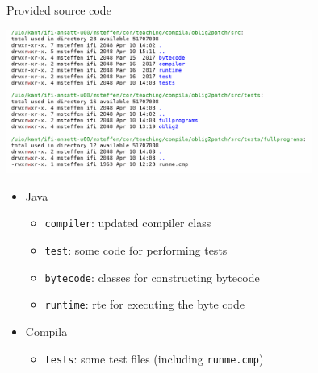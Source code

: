 \documentclass{beamer}
\begin{document}
\begin{frame}[label={sec:org3865586},fragile]{Provided source code}

 \begin{center}
 \includegraphics[width=0.75\textwidth]{figures/snaps/directory-src}
\end{center}


\begin{itemize}
\item Java

\begin{itemize}
\item \texttt{compiler}: updated compiler class
\item \texttt{test}:   some code for performing tests
\item \texttt{bytecode}: classes for constructing bytecode
\item \texttt{runtime}: rte for executing the byte code
\end{itemize}

\item Compila
\begin{itemize}
\item \texttt{tests}: some test files (including \texttt{runme.cmp})
\end{itemize}
\end{itemize}
\end{frame}
\end{document}
